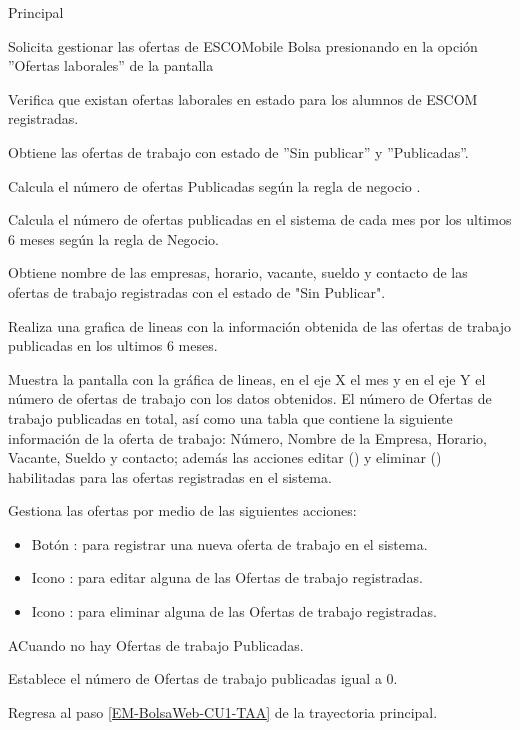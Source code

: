 \begin{UCtrayectoria}{Principal}

	\UCpaso [\UCactor] Solicita gestionar las ofertas de ESCOMobile Bolsa presionando en la opción ''Ofertas laborales'' de la pantalla 

	\UCpaso Verifica que existan ofertas laborales en estado para los alumnos de ESCOM registradas.  

	\UCpaso Obtiene las ofertas de trabajo con estado de ''Sin publicar'' y ''Publicadas''.

	\UCpaso Calcula el número de ofertas Publicadas según la regla de negocio .

	\UCpaso Calcula el número de ofertas publicadas en el sistema de cada mes por los ultimos 6 meses según la regla de Negocio.

	\UCpaso Obtiene nombre de las empresas, horario, vacante, sueldo y contacto de las ofertas de trabajo registradas con el estado de "Sin Publicar".
	
	\UCpaso Realiza una grafica de lineas con la información obtenida de las ofertas de trabajo publicadas en los ultimos 6 meses.
	
	\UCpaso Muestra la pantalla  con la gráfica de lineas, en el eje X el mes y en el eje Y el número de ofertas de trabajo con los datos obtenidos. El número de Ofertas de trabajo publicadas en total, así como una tabla que contiene la siguiente información de la oferta de trabajo: Número, Nombre de la Empresa, Horario, Vacante, Sueldo y contacto; además las acciones editar () y eliminar () habilitadas para las ofertas registradas en el sistema. \label{EM-BolsaWeb-CU1-TAA}

	\UCpaso [\UCactor] Gestiona las ofertas por medio de las siguientes acciones: 
	\begin{itemize}
		\item Botón : para registrar una nueva oferta de trabajo en el sistema.
		\item Icono : para editar alguna de las Ofertas de trabajo registradas.
		\item Icono : para eliminar alguna de las Ofertas de trabajo registradas.
	\end{itemize}

\end{UCtrayectoria}

\begin{UCtrayectoriaA}{A}{Cuando no hay Ofertas de trabajo Publicadas.}
	
	\UCpaso Establece el número de Ofertas de trabajo publicadas igual a 0. 

	\UCpaso Regresa al paso \ref{EM-BolsaWeb-CU1-TAA} de la trayectoria principal.
\end{UCtrayectoriaA}
